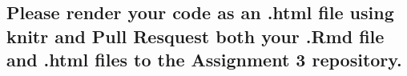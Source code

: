 \documentclass[
]{article}
\begin{document}
\hypertarget{please-render-your-code-as-an-.html-file-using-knitr-and-pull-resquest-both-your-.rmd-file-and-.html-files-to-the-assignment-3-repository.}{%
\subsection{Please render your code as an .html file using knitr and
Pull Resquest both your .Rmd file and .html files to the Assignment 3
repository.}\label{please-render-your-code-as-an-.html-file-using-knitr-and-pull-resquest-both-your-.rmd-file-and-.html-files-to-the-assignment-3-repository.}}
\end{document}
